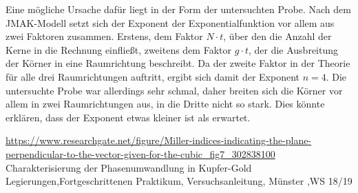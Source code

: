 \documentclass[
	a4paper,
	12pt,
	pagesize,
	ngerman
]{scrartcl}
\begin{document}
Eine mögliche Ursache dafür liegt in der Form der untersuchten Probe. Nach dem JMAK-Modell setzt sich der Exponent der Exponentialfunktion vor allem aus zwei Faktoren zusammen. Erstens, dem Faktor $N\cdot t$, über den die Anzahl der Kerne in die Rechnung einfließt, zweitens dem Faktor $g \cdot t$, der die Ausbreitung der Körner in eine Raumrichtung beschreibt. Da der zweite Faktor in der Theorie für alle drei Raumrichtungen auftritt, ergibt sich damit der Exponent $n=4$. Die untersuchte Probe war allerdings sehr schmal, daher breiten sich die Körner vor allem in zwei Raumrichtungen aus, in die Dritte nicht so stark. Dies könnte erklären, dass der Exponent etwas kleiner ist als erwartet.

\newpage

\begin{thebibliography}{9}
 \url{https://www.researchgate.net/figure/Miller-indices-indicating-the-plane-perpendicular-to-the-vector-given-for-the-cubic_fig7_302838100}\\
Charakterisierung der Phasenumwandlung in Kupfer-Gold Legierungen,Fortgeschrittenen Praktikum, Versuchsanleitung, Münster ,WS 18/19

\end{thebibliography}
\end{document}
